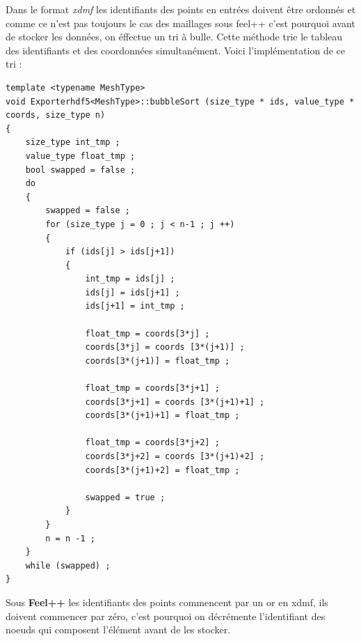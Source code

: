 \documentclass[12pt]{article}
\begin{document}
Dans le format \emph{xdmf} les identifiants des points en entrées doivent être ordonnés et comme ce n'est pas toujours le cas des maillages sous feel++ c'est pourquoi avant de stocker les données, on éffectue un tri à bulle. Cette méthode trie le tableau des identifiants et des coordonnées simultanément. \newline
Voici l'implémentation de ce tri :
\begin{lstlisting}
template <typename MeshType>
void Exporterhdf5<MeshType>::bubbleSort (size_type * ids, value_type * coords, size_type n) 
{
    size_type int_tmp ;
    value_type float_tmp ;
    bool swapped = false ;
    do 
    {
        swapped = false ;
        for (size_type j = 0 ; j < n-1 ; j ++) 
        {
            if (ids[j] > ids[j+1]) 
            {
                int_tmp = ids[j] ;
                ids[j] = ids[j+1] ;
                ids[j+1] = int_tmp ;

                float_tmp = coords[3*j] ;
                coords[3*j] = coords [3*(j+1)] ;
                coords[3*(j+1)] = float_tmp ;

                float_tmp = coords[3*j+1] ;
                coords[3*j+1] = coords [3*(j+1)+1] ;
                coords[3*(j+1)+1] = float_tmp ;

                float_tmp = coords[3*j+2] ;
                coords[3*j+2] = coords [3*(j+1)+2] ;
                coords[3*(j+1)+2] = float_tmp ;

                swapped = true ;
            }
        }
        n = n -1 ;
    }
    while (swapped) ;
}
\end{lstlisting}
Sous \textbf{Feel++} les identifiants des points commencent par un or en xdmf, ils doivent commencer par zéro, c'est pourquoi on décrémente l'identifiant des noeuds qui composent l'élément avant de les stocker.
\end{document}
